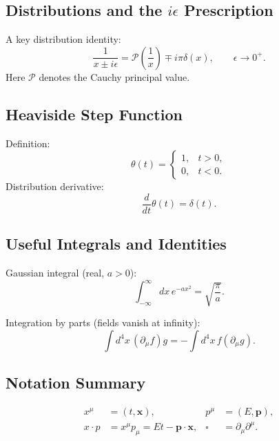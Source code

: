 \subsection{Distributions and the $i\epsilon$ Prescription}
A key distribution identity:
\begin{equation}
\frac{1}{x\pm i\epsilon} = \mathcal{P}\left(\frac{1}{x}\right)\mp i\pi \delta(x),
\qquad \epsilon\to 0^+.
\end{equation}
Here $\mathcal{P}$ denotes the Cauchy principal value.

\subsection{Heaviside Step Function}
Definition:
\begin{equation}
\theta(t)=
\begin{cases}
1, & t>0,\\
0, & t<0.
\end{cases}
\end{equation}
Distribution derivative:
\begin{equation}
\frac{d}{dt}\theta(t)=\delta(t).
\end{equation}

\subsection{Useful Integrals and Identities}
Gaussian integral (real, $a>0$):
\begin{equation}
\int_{-\infty}^{\infty} dx\, e^{-ax^2} = \sqrt{\frac{\pi}{a}}.
\end{equation}

Integration by parts (fields vanish at infinity):
\begin{equation}
\int d^4x\, (\partial_\mu f) g = -\int d^4x\, f (\partial_\mu g).
\end{equation}

\subsection{Notation Summary}
\begin{align}
x^\mu &= (t,\mathbf{x}), &
p^\mu &= (E,\mathbf{p}),\\
x\cdot p &= x^\mu p_\mu = Et-\mathbf{p}\cdot\mathbf{x}, &
\square &= \partial_\mu\partial^\mu.
\end{align}
